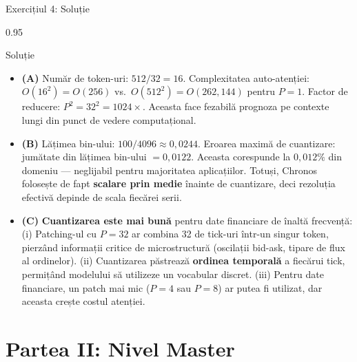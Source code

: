 \documentclass[9pt, aspectratio=169, t]{beamer}
\begin{document}
\begin{frame}{Exercițiul 4: Soluție}
    \begin{cminipage}{0.95\textwidth}
    \begin{exampleblock}{Soluție}
        {\footnotesize
        \begin{itemize}\setlength{\itemsep}{3pt}
            \item \textcolor{MainBlue}{\textbf{(A)}} Număr de token-uri: $512 / 32 = 16$. Complexitatea auto-atenției: $O(16^2) = O(256)$ vs.\ $O(512^2) = O(262{,}144)$ pentru $P = 1$. Factor de reducere: $P^2 = 32^2 = 1024\times$. Aceasta face fezabilă prognoza pe contexte lungi din punct de vedere computațional.
            \item \textcolor{MainBlue}{\textbf{(B)}} Lățimea bin-ului: $100 / 4096 \approx 0{,}0244$. Eroarea maximă de cuantizare: jumătate din lățimea bin-ului $= 0{,}0122$. Aceasta corespunde la $0{,}012\%$ din domeniu --- neglijabil pentru majoritatea aplicațiilor. Totuși, Chronos folosește de fapt \textbf{scalare prin medie} înainte de cuantizare, deci rezoluția efectivă depinde de scala fiecărei serii.
            \item \textcolor{MainBlue}{\textbf{(C)}} \textbf{Cuantizarea este mai bună} pentru date financiare de înaltă frecvență:
                (i) Patching-ul cu $P=32$ ar combina 32 de tick-uri într-un singur token, pierzând informații critice de microstructură (oscilații bid-ask, tipare de flux al ordinelor).
                (ii) Cuantizarea păstrează \textbf{ordinea temporală} a fiecărui tick, permițând modelului să utilizeze un vocabular discret.
                (iii) Pentru date financiare, un patch mai mic ($P = 4$ sau $P = 8$) ar putea fi utilizat, dar aceasta crește costul atenției.
        \end{itemize}
        }
    \end{exampleblock}
    \end{cminipage}
\end{frame}

\section{Partea II: Nivel Master}
\end{document}
